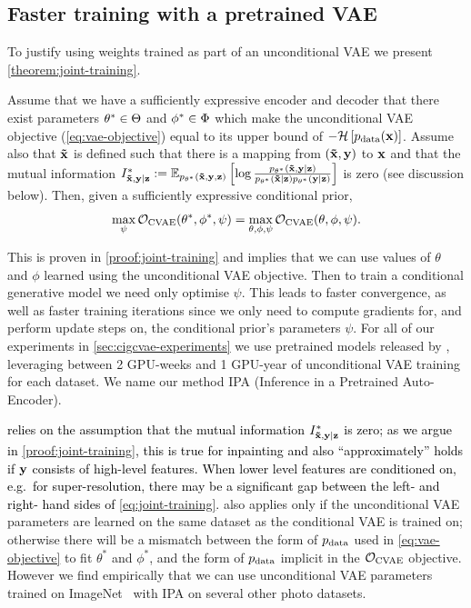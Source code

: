 \subsection{Faster training with a pretrained VAE}
To justify using weights trained as part of an unconditional VAE we present
\cref{theorem:joint-training}.
%
\begin{theorem} \label{theorem:joint-training} Assume that we have a
  sufficiently expressive encoder and decoder that there exist parameters
  ${\theta}^*\in\Theta$ and ${\phi}^*\in\Phi$ which make the
  unconditional VAE objective (\cref{eq:vae-objective}) equal to its upper bound of
  $-\mathcal{H}\left[ p_{\rm{data}}({\mathbf{x}}) \right]$. Assume also that $\mathbf{\tilde{x}}{}$ is
  defined such that there is a mapping from $(\mathbf{\tilde{x}}{},{\mathbf{y}})$ to ${\mathbf{x}}$ and
  that the mutual information ${I^*_{\mathbf{\tilde{x}}{},\mathbf{y}{}|\mathbf{z}{}}{} := \mathbb{E}_{p_{\theta^*}(\mathbf{\tilde{x}}{}, {\mathbf{y}},
      {\mathbf{z}})} \left[ \log \frac{p_{\theta^*}(\mathbf{\tilde{x}}{},{\mathbf{y}}|{\mathbf{z}})
      }{ p_{\theta^*}(\mathbf{\tilde{x}}{}|{\mathbf{z}})p_{\theta^*}({\mathbf{y}}|{\mathbf{z}}) }
    \right]}$ is zero (see discussion below). Then, given a sufficiently expressive
  conditional prior,
  \begin{equation} \label{eq:joint-training}
    \max_{\psi} {\mathcal{O}}_\text{CVAE}({\theta}^*, {\phi}^*, \psi) = \max_{\theta, \phi, \psi} {\mathcal{O}}_\text{CVAE}(\theta, \phi, \psi).
  \end{equation}
\end{theorem}
This is proven in \cref{proof:joint-training} and implies that we can use values
of $\theta$ and $\phi$ learned using the unconditional VAE objective. Then to
train a conditional generative model we need only optimise $\psi$. This
leads to faster convergence, as well as faster training iterations since we only
need to compute gradients for, and perform update steps on, the conditional prior's parameters $\psi$. For all of our experiments in
\cref{sec:cigcvae-experiments} we use pretrained models released by
\citet{child2020very}, leveraging between 2 GPU-weeks and 1 GPU-year of
unconditional VAE training for each dataset. We name our method IPA (Inference
in a Pretrained Auto-Encoder).

\textcolor{black}{ relies on the assumption that
  the mutual information $I^*_{\mathbf{\tilde{x}}{},\mathbf{y}{}|\mathbf{z}{}}$ is zero; as we argue in
  \cref{proof:joint-training}, this is true for inpainting and also
  ``approximately'' holds if ${\mathbf{y}}$ consists of high-level features. When
  lower level features are conditioned on, e.g.~for super-resolution, there may
  be a significant gap between the left- and right- hand sides of
  \cref{eq:joint-training}. }  also applies only if
the unconditional VAE parameters are learned on the same dataset as the
conditional VAE is trained on; otherwise there will be a mismatch between the
form of $p_{\rm{data}}$ used in \cref{eq:vae-objective} to fit $\theta^*$ and $\phi^*$, and
the form of $p_{\rm{data}}$ implicit in the ${\mathcal{O}}_\text{CVAE}$ objective.
However we find empirically that we can use unconditional VAE parameters trained
on ImageNet~\citep{deng2009imagenet} with IPA on several other photo datasets.

